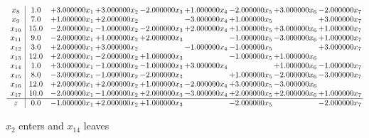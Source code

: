 \documentclass[10pt]{article}
\begin{document}
\[\begin{array}{c| c c@{\hskip 2pt} c@{\hskip 2pt} c@{\hskip 2pt} c@{\hskip 2pt} c@{\hskip 2pt} c@{\hskip 2pt} c@{\hskip 2pt} }
 x_{8}   &  1.0 & + 3.000000 x_{1} & + 3.000000 x_{2} & -2.000000 x_{3} & + 1.000000 x_{4} & -2.000000 x_{5} & + 3.000000 x_{6} & -2.000000 x_{7}\\
 x_{9}   &  7.0 & + 1.000000 x_{1} & + 2.000000 x_{2} &   & -3.000000 x_{4} & + 1.000000 x_{5} &   & + 3.000000 x_{7}\\
 x_{10}   &  15.0 & -2.000000 x_{1} & -1.000000 x_{2} & -2.000000 x_{3} & + 2.000000 x_{4} & + 1.000000 x_{5} & + 3.000000 x_{6} & + 1.000000 x_{7}\\
 x_{11}   &  9.0 & -2.000000 x_{1} & + 1.000000 x_{2} & + 2.000000 x_{3} &   & -1.000000 x_{5} & -3.000000 x_{6} & + 1.000000 x_{7}\\
 x_{12}   &  3.0 & + 2.000000 x_{1} & + 3.000000 x_{2} &   & -1.000000 x_{4} & -1.000000 x_{5} &   & + 3.000000 x_{7}\\
 x_{13}   &  12.0 & + 2.000000 x_{1} & -2.000000 x_{2} & + 1.000000 x_{3} &   & -1.000000 x_{5} & + 1.000000 x_{6} &   \\
 x_{14}   &  1.0 & + 3.000000 x_{1} & -1.000000 x_{2} & -1.000000 x_{3} & + 3.000000 x_{4} &   & + 1.000000 x_{6} & -1.000000 x_{7}\\
 x_{15}   &  8.0 & -3.000000 x_{1} & -1.000000 x_{2} & -2.000000 x_{3} &   & + 1.000000 x_{5} & -2.000000 x_{6} & -3.000000 x_{7}\\
 x_{16}   &  12.0 & + 2.000000 x_{1} & + 2.000000 x_{2} & + 1.000000 x_{3} & -2.000000 x_{4} & + 3.000000 x_{5} & -3.000000 x_{6} &   \\
 x_{17}   &  10.0 & -2.000000 x_{1} & -1.000000 x_{2} & + 2.000000 x_{3} & -3.000000 x_{4} & + 2.000000 x_{5} & + 2.000000 x_{6} & + 1.000000 x_{7}\\
\hline
z    &  0.0 & -1.000000 x_{1} & + 2.000000 x_{2} & + 1.000000 x_{3} &   & -2.000000 x_{5} &   & -2.000000 x_{7}\\
\end{array}\]


 $ x_{2} $ enters and $ x_{14} $ leaves 
\end{document}
